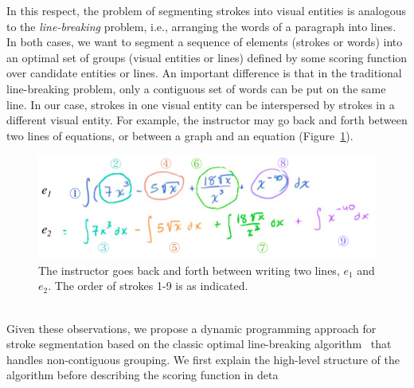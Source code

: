 In this respect, the problem of segmenting strokes into visual
entities is analogous to the
\emph{line-breaking} problem, i.e., arranging the words of a paragraph
into lines.  In both cases, we want to segment a sequence of elements
(strokes or words) into an optimal set of groups (visual entities or
lines) defined by some scoring function over candidate entities or lines.
An important difference is that in the traditional line-breaking problem, only a
contiguous set of words can be put on the same line. In our case,
strokes in one visual entity can be interspersed by strokes in a
different visual entity. For example, the instructor may
go back and forth between two lines of equations, or
between a graph and an equation (Figure~\ref{Fig:line_order}).\\
%
\begin{figure}[h]
        \centering
        \includegraphics[width=\textwidth]{figures/line_order.pdf}
        \caption{The instructor goes back and forth between writing two lines,
$e_1$ and $e_2$. The order of strokes 1-9 is as indicated.}
        \label{Fig:line_order}
\end{figure}\\
%
Given these observations, we propose a dynamic programming approach for
stroke segmentation based on the classic optimal line-breaking
algorithm~\cite{knuth1981breaking} that handles non-contiguous grouping.
We first explain the high-level structure of the algorithm before
describing the scoring function in deta
%
